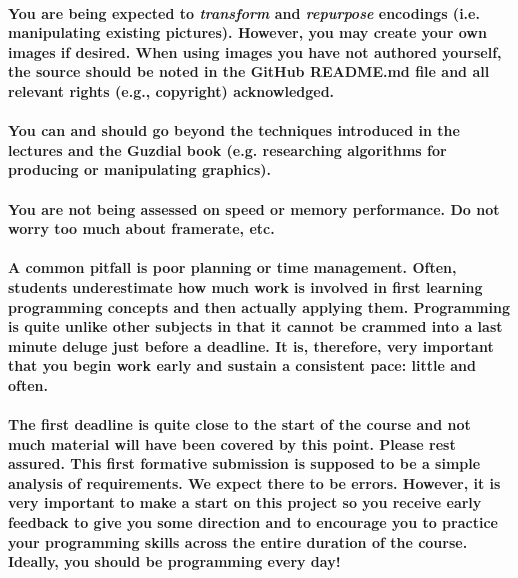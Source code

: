 \documentclass{../../fal_assignment}
\begin{document}
\paragraph{You are being expected to \textit{transform} and \textit{repurpose} encodings (i.e. manipulating existing pictures). However, you may create your own images if desired. When using images you have not authored yourself, the source should be noted in the GitHub README.md file and all relevant rights (e.g., copyright) acknowledged. }

\newpage

\paragraph{You can and should go beyond the techniques introduced in the lectures and the Guzdial book (e.g. researching algorithms for producing or manipulating graphics).}

\paragraph{You are not being assessed on speed or memory performance. Do not worry too much about framerate, etc.}

\paragraph{A common pitfall is poor planning or time management. Often, students underestimate how much work is involved in first learning programming concepts and then actually applying them. Programming is quite unlike other subjects in that it cannot be crammed into a last minute deluge just before a deadline. It is, therefore, very important that you begin work early and sustain a consistent pace: little and often.}

\paragraph{The first deadline is quite close to the start of the course and not much material will have been covered by this point. Please rest assured. This first formative submission is supposed to be a simple analysis of requirements. We expect there to be errors. However, it is very important to make a start on this project so you receive early feedback to give you some direction and to encourage you to practice your programming skills across the entire duration of the course. Ideally, you should be programming every day!}
\end{document}
